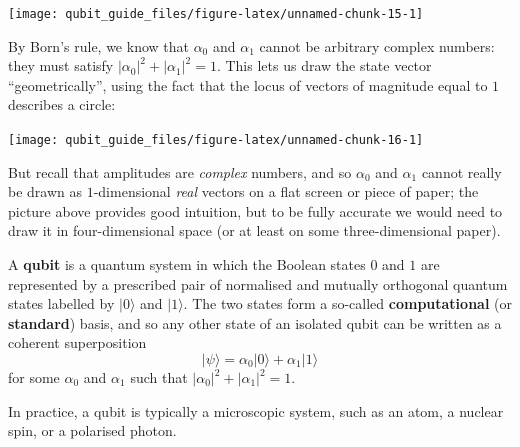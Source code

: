 \documentclass[fleqn,a4paper]{article}
\newenvironment{idea}{\everypar{\setlength{\parindent}{1.5em}}}{}
\theoremstyle{definition}
\theoremstyle{definition}
\theoremstyle{definition}
\theoremstyle{definition}
\theoremstyle{remark}
\begin{document}
\begin{center}\texttt{[image: qubit\_guide\_files/figure-latex/unnamed-chunk-15-1]} \end{center}

By Born's rule, we know that \(\alpha_0\) and \(\alpha_1\) cannot be arbitrary complex numbers: they must satisfy \(|\alpha_0|^2+|\alpha_1|^2=1\).
This lets us draw the state vector ``geometrically'', using the fact that the locus of vectors of magnitude equal to \(1\) describes a circle:

\begin{center}\texttt{[image: qubit\_guide\_files/figure-latex/unnamed-chunk-16-1]} \end{center}

But recall that amplitudes are \emph{complex} numbers, and so \(\alpha_0\) and \(\alpha_1\) cannot really be drawn as \(1\)-dimensional \emph{real} vectors on a flat screen or piece of paper;
the picture above provides good intuition, but to be fully accurate we would need to draw it in four-dimensional space (or at least on some three-dimensional paper).

\begin{idea}
A \textbf{qubit} is a quantum system in which the Boolean states \(0\) and \(1\) are represented by a prescribed pair of normalised and mutually orthogonal quantum states labelled by \(|0\rangle\) and \(|1\rangle\).
The two states form a so-called \textbf{computational} (or \textbf{standard}) basis, and so any other state of an isolated qubit can be written as a coherent superposition
\[
  |\psi\rangle = \alpha_0|0\rangle + \alpha_1|1\rangle
\]
for some \(\alpha_0\) and \(\alpha_1\) such that \(|\alpha_0|^2 + |\alpha_1|^2 = 1\).

In practice, a qubit is typically a microscopic system, such as an atom, a nuclear spin, or a polarised photon.

\end{idea}
\end{document}
